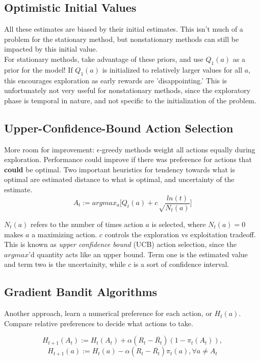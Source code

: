 \documentclass[a4paper]{article}
\begin{document}
\subsection{Optimistic Initial Values}
All these estimates are biased by their initial estimates. This isn't much of a problem for the stationary method, but nonstationary methods can still be impacted by this initial value.\\

For stationary methods, take advantage of these priors, and use $Q_1(a)$ as a prior for the model! If $Q_1(a)$ is initialized to relatively larger values for all $a$, this encourages exploration as early rewards are 'disappointing.' This is unfortunately not very useful for nonstationary methods, since the exploratory phase is temporal in nature, and not specific to the initialization of the problem.

\subsection{Upper-Confidence-Bound Action Selection}
More room for improvement: $\epsilon$-greedy methods weight all actions equally during exploration. Performance could improve if there was preference for actions that \textbf{could} be optimal. Two important heuristics for tendency towards what is optimal are estimated distance to what is optimal, and uncertainty of the estimate. $$A_t := argmax_a\Bigg[Q_t(a) + c\sqrt\frac{ln(t)}{N_t(a)}\Bigg]$$

$N_t(a)$ refers to the number of times action $a$ is selected, where $N_t(a) = 0$ makes $a$ a maximizing action. $c$ controls the exploration vs exploitation tradeoff.\\

This is known as \textit{upper confidence bound} (UCB) action selection, since the $argmax$'d quantity acts like an upper bound. Term one is the estimated value and term two is the uncertainity, while $c$ is a sort of confidence interval.

\subsection{Gradient Bandit Algorithms}
Another approach, learn a numerical preference for each action, or $H_t(a)$. Compare relative preferences to decide what actions to take.

$$H_{t+1}(A_t) := H_t(A_t) + \alpha(R_t - \overline{R_t})(1 - \pi_t(A_t)),$$
$$H_{t+1}(a) := H_t(a) - \alpha(R_t - \overline{R_t})\pi_t(a), \forall a \neq A_t$$
\end{document}
